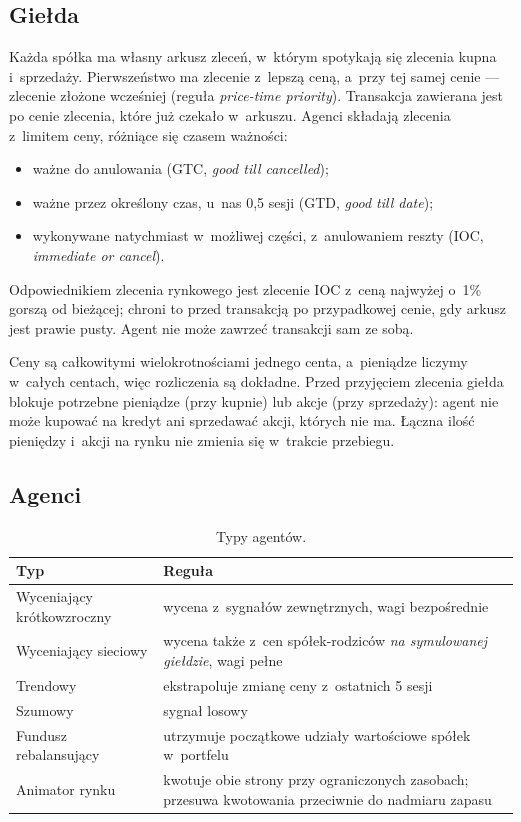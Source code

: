 \documentclass[11pt,a4paper]{article}
\begin{document}
\subsection{Giełda}
Każda spółka ma własny arkusz zleceń, w~którym spotykają się zlecenia kupna i~sprzedaży. Pierwszeństwo ma zlecenie
z~lepszą ceną, a~przy tej samej cenie --- zlecenie złożone wcześniej (reguła \emph{price-time priority}).
Transakcja zawierana jest po cenie zlecenia, które już czekało w~arkuszu. Agenci składają zlecenia z~limitem ceny,
różniące się czasem ważności:
\begin{itemize}[label=--]
  \item ważne do anulowania (GTC, \emph{good till cancelled});
  \item ważne przez określony czas, u~nas 0,5 sesji (GTD, \emph{good till date});
  \item wykonywane natychmiast w~możliwej części, z~anulowaniem reszty (IOC, \emph{immediate or cancel}).
\end{itemize}
Odpowiednikiem zlecenia rynkowego jest zlecenie IOC z~ceną najwyżej o~1\% gorszą od bieżącej; chroni to przed
transakcją po przypadkowej cenie, gdy arkusz jest prawie pusty. Agent nie może zawrzeć transakcji sam ze sobą.

Ceny są całkowitymi wielokrotnościami jednego centa, a~pieniądze liczymy w~całych centach, więc rozliczenia są
dokładne. Przed przyjęciem zlecenia giełda blokuje potrzebne pieniądze (przy kupnie) lub akcje (przy sprzedaży):
agent nie może kupować na kredyt ani sprzedawać akcji, których nie ma. Łączna ilość pieniędzy i~akcji na rynku nie
zmienia się w~trakcie przebiegu.

\subsection{Agenci}\label{sec:agenci}

\begin{table}[!htbp]
\centering\small
\caption{Typy agentów.}\label{tab:agenci}
\begin{tabular}{@{}l >{\raggedright\arraybackslash}p{}@{}}
\toprule
Typ & Reguła \\
\midrule
Wyceniający krótkowzroczny & wycena z~sygnałów zewnętrznych, wagi bezpośrednie \\ \addlinespace[3pt]
Wyceniający sieciowy & wycena także z~cen spółek-rodziców \emph{na symulowanej giełdzie}, wagi pełne \\ \addlinespace[3pt]
Trendowy & ekstrapoluje zmianę ceny z~ostatnich 5 sesji \\ \addlinespace[3pt]
Szumowy & sygnał losowy \\ \addlinespace[3pt]
Fundusz rebalansujący & utrzymuje początkowe udziały wartościowe spółek w~portfelu \\ \addlinespace[3pt]
Animator rynku & kwotuje obie strony przy ograniczonych zasobach; przesuwa kwotowania przeciwnie do nadmiaru
  zapasu \\
\bottomrule
\end{tabular}
\end{table}
\end{document}
